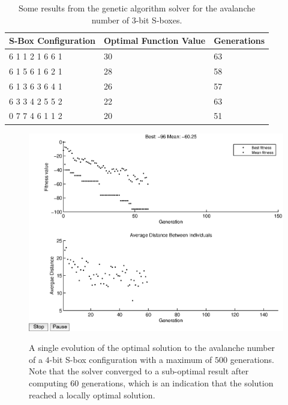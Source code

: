 \documentclass[11pt]{article}
\begin{document}
\begin{table}
	\centering
	\label{avTable}
	\caption{Some results from the genetic algorithm solver for the avalanche number of $3$-bit S-boxes.}
    \begin{tabular}{|l|l|l|}
        \hline
        S-Box Configuration & Optimal Function Value & Generations \\ \hline
        6     1     1     2     1     6     6     1 & 30 & 63 \\
        6     1     5     6     1     6     2     1 & 28 & 58 \\ 
        6     1     3     6     3     6     4     1 & 26 & 57 \\ 
	6     3     3     4     2     5     5     2 & 22 & 63 \\ 
        0     7     7     4     6     1     1     2 & 20 & 51 \\ 
        \hline
    \end{tabular}
\end{table}

\begin{figure}[!ht]
\centering
	\includegraphics[scale=0.5]{images/avalanche_results16.eps} \\
	\label{av16}
	\caption{A single evolution of the optimal solution to the avalanche number of a $4$-bit S-box configuration with a maximum of $500$ generations. Note that the solver converged to a sub-optimal result after computing $60$ generations, which is an indication that the solution reached a locally optimal solution.}
\end{figure}
\end{document}
